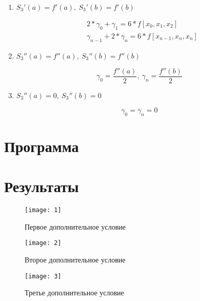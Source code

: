 \documentclass[12pt, a4paper]{article}
\begin{document}
	\begin{enumerate}
		\item $S_3'(a) = f'(a),\ S_3'(b) = f'(b)$
		
		\begin{align}
		& 2*\gamma_0 + \gamma_1 = 6*f[x_0,x_1,x_2]\\
		& \gamma_{n-1} + 2*\gamma_n = 6*f[x_{n-1},x_n,x_n]
		\end{align}
		
		\item $S_3''(a) = f''(a),\ S_3''(b)=f''(b)$
		
		\begin{equation}
		\gamma_0 = \frac{f''(a)}{2},\ \gamma_{n} = \frac{f''(b)}{2}
		\end{equation}
		
		\item $S_3''(a) = 0,\ S_3''(b) = 0$
		
		\begin{equation}
		\gamma_0 = \gamma_{n} = 0
		\end{equation}
		
	\end{enumerate}
	
	\section{Программа}
	
	
	
	\section{Результаты}
	
	\begin{figure}[H]
		\centering
		\texttt{[image: 1]}
		\caption{Первое дополнительное условие}
		\label{fig:case_1}
	\end{figure}
	
	
	\begin{figure}[H]
		\centering
		\texttt{[image: 2]}
		\caption{Второе дополнительное условие}
		\label{fig:case_2}
	\end{figure}
	
	
	
	\begin{figure}[H]
		\centering
		\texttt{[image: 3]}
		\caption{Третье дополнительное условие}
		\label{fig:case_3}
	\end{figure}
	
\end{document}
